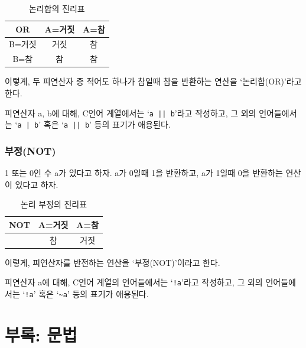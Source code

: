 \documentclass[a4paper,12pt]{book}
\newcommand{\V}[1]{\Verb|#1|}
\newcommand{\Ve}[1]{\Verb+#1+}
\begin{document}
\begin{appendices}
\begin{table}[H]
            \caption{논리합의 진리표}

            \begin{tabular}{ || c || c | c || }
                \hline
                OR    & A=거짓 & A=참 \\
                \hline\hline
                B=거짓 &   거짓 &   참 \\
                \hline
                B=참   &    참 &   참 \\
                \hline
            \end{tabular}
        \end{table}

        이렇게, 두 피연산자 중 적어도 하나가 참일때 참을 반환하는 연산을 `논리합(OR)'라고 한다.

        피연산자 a, b에 대해, C언어 계열에서는 `\Ve{a || b}'라고 작성하고,
        그 외의 언어들에서는 `\Ve{a | b}' 혹은 `\Ve{a || b}' 등의 표기가 애용된다.


    \subsection{부정(NOT)}

        1 또는 0인 수 a가 있다고 하자.
        a가 0일때 1을 반환하고,
        a가 1일때 0을 반환하는 연산이 있다고 하자.

        \begin{table}[H]
            \centering

            \caption{논리 부정의 진리표}

            \begin{tabular}{ || c || c | c || }
                \hline
                NOT & A=거짓 & A=참 \\
                \hline\hline
                    &     참 & 거짓 \\
                \hline
            \end{tabular}
        \end{table}

        이렇게, 피연산자를 반전하는 연산을 `부정(NOT)'이라고 한다.

        피연산자 a에 대해, C언어 계열의 언어들에서는 `\V{!a}'라고 작성하고,
        그 외의 언어들에서는 `\V{!a}' 혹은 `\V{~a}' 등의 표기가 애용된다.


\chapter{부록: 문법}


\end{appendices}
\end{document}
